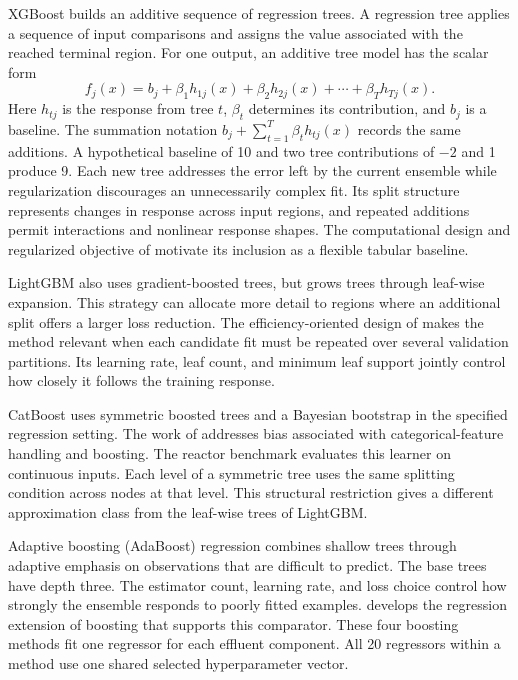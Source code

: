 XGBoost builds an additive sequence of regression trees. A regression tree applies a sequence of input comparisons and assigns the value associated with the reached terminal region. For one output, an additive tree model has the scalar form
\[
f_j(x)=b_j+\beta_1h_{1j}(x)+\beta_2h_{2j}(x)+\cdots+\beta_Th_{Tj}(x).
\]
Here $h_{tj}$ is the response from tree $t$, $\beta_t$ determines its contribution, and $b_j$ is a baseline. The summation notation $b_j+\sum_{t=1}^T\beta_th_{tj}(x)$ records the same additions. A hypothetical baseline of 10 and two tree contributions of $-2$ and 1 produce 9. Each new tree addresses the error left by the current ensemble while regularization discourages an unnecessarily complex fit. Its split structure represents changes in response across input regions, and repeated additions permit interactions and nonlinear response shapes. The computational design and regularized objective of \citet{ChenGuestrin2016} motivate its inclusion as a flexible tabular baseline.

LightGBM also uses gradient-boosted trees, but grows trees through leaf-wise expansion. This strategy can allocate more detail to regions where an additional split offers a larger loss reduction. The efficiency-oriented design of \citet{Ke2017} makes the method relevant when each candidate fit must be repeated over several validation partitions. Its learning rate, leaf count, and minimum leaf support jointly control how closely it follows the training response.

CatBoost uses symmetric boosted trees and a Bayesian bootstrap in the specified regression setting. The work of \citet{Prokhorenkova2018} addresses bias associated with categorical-feature handling and boosting. The reactor benchmark evaluates this learner on continuous inputs. Each level of a symmetric tree uses the same splitting condition across nodes at that level. This structural restriction gives a different approximation class from the leaf-wise trees of LightGBM.

Adaptive boosting (AdaBoost) regression combines shallow trees through adaptive emphasis on observations that are difficult to predict. The base trees have depth three. The estimator count, learning rate, and loss choice control how strongly the ensemble responds to poorly fitted examples. \citet{Drucker1997} develops the regression extension of boosting that supports this comparator. These four boosting methods fit one regressor for each effluent component. All 20 regressors within a method use one shared selected hyperparameter vector.

